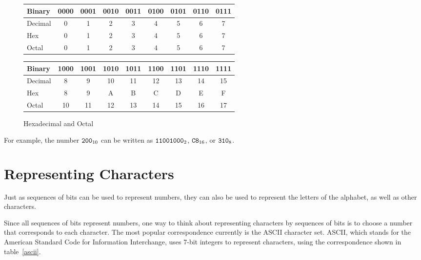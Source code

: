 \begin{figure}
\caption{Hexadecimal and Octal}
\label{datarep-hex-oct-table}
\begin{center}
\begin{tabular}{|l|c|c|c|c|c|c|c|c|}
\hline
Binary  & 0000  & 0001  & 0010  & 0011  & 0100  & 0101  & 0110  & 0111  \\
\hline
Decimal & 0     & 1     & 2     & 3     & 4     & 5     & 6     & 7     \\
\hline
Hex     & 0     & 1     & 2     & 3     & 4     & 5     & 6     & 7     \\
\hline
Octal   & 0     & 1     & 2     & 3     & 4     & 5     & 6     & 7     \\
\hline
\end{tabular}
\end{center}

\begin{center}
\begin{tabular}{|l|c|c|c|c|c|c|c|c|}
\hline
Binary  & 1000  & 1001  & 1010  & 1011  & 1100  & 1101  & 1110  & 1111  \\
\hline
Decimal & 8     & 9     & 10    & 11    & 12    & 13    & 14    & 15    \\
\hline
Hex     & 8     & 9     & A     & B     & C     & D     & E     & F     \\
\hline
Octal   & 10    & 11    & 12    & 13    & 14    & 15    & 16    & 17    \\
\hline
\end{tabular}
\end{center}
\end{figure}

For example, the number ${\tt 200}_{10}$ can be written as
${\tt 11001000}_{2}$,
${\tt C8}_{16}$, or
${\tt 310}_{8}$.

\section{Representing Characters}

Just as sequences of bits can be used to represent numbers,
they can also be used to represent the letters of the alphabet,
as well as other characters.

Since all sequences of bits represent numbers, one way to
think about representing characters by sequences of bits
is to choose a number that corresponds to each character.
The most popular correspondence currently is the ASCII character set.
ASCII, which stands for the American Standard Code for Information
Interchange, uses 7-bit integers to represent characters, using the
correspondence shown in table~\ref{ascii}.


